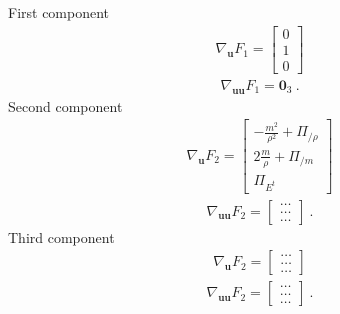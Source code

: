 \documentclass[letterpaper,10pt,english]{jupyterBook}
\begin{document}
\sphinxAtStartPar
{} First component
\begin{equation*}
\begin{split}\nabla_{\mathbf{u}} F_1 = \begin{bmatrix} 0 \\ 1 \\ 0 \end{bmatrix}\end{split}
\end{equation*}\begin{equation*}
\begin{split}\nabla_{\mathbf{u} \mathbf{u}} F_1 = \mathbf{0}_3 \ .\end{split}
\end{equation*}
\sphinxAtStartPar
Second component
\begin{equation*}
\begin{split}\nabla_{\mathbf{u}} F_2 = \begin{bmatrix} - \frac{m^2}{\rho^2} + \Pi_{/\rho} \\ 2 \frac{m}{\rho} + \Pi_{/m} \\ \Pi_{E^t} \end{bmatrix}\end{split}
\end{equation*}\begin{equation*}
\begin{split}\nabla_{\mathbf{u} \mathbf{u}} F_2 = \begin{bmatrix} \dots \\ \dots \\ \dots \end{bmatrix} \ .\end{split}
\end{equation*}
\sphinxAtStartPar
Third component
\begin{equation*}
\begin{split}\nabla_{\mathbf{u}} F_2 = \begin{bmatrix} \dots \\ \dots \\ \dots \end{bmatrix}\end{split}
\end{equation*}\begin{equation*}
\begin{split}\nabla_{\mathbf{u} \mathbf{u}} F_2 = \begin{bmatrix} \dots \\ \dots \\ \dots \end{bmatrix} \ .\end{split}
\end{equation*}
\end{document}
